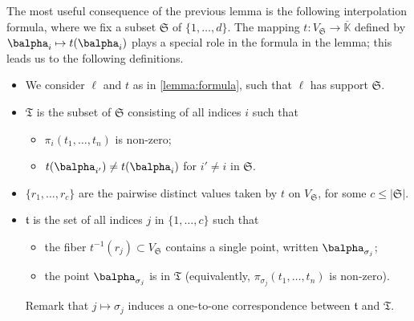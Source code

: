 \documentclass[12pt]{article}
\def\Kbar {{\ensuremath{\overline{\mathbb{K}}}}}
\begin{document}
\noindent 
The most useful consequence of the previous lemma is the following
interpolation formula, where we fix a subset $\mathfrak{S}$ of 
$\{1,\dots,d\}$. The mapping $t:V_\mathfrak{S} \to \Kbar$
defined by $\balpha_i \mapsto t(\balpha_{i})$ plays a special role in
the formula in the lemma; this leads us to the following definitions.
\begin{itemize}
	\item We consider $\ell$ and $t$ as in \cref{lemma:formula}, such
	that $\ell$ has support $\mathfrak{S}$.
	\item $\mathfrak{T}$ is the subset of $\mathfrak{S}$ consisting of
	all indices $i$ such that 
	\begin{itemize}
		\item $\pi_i(t_1,\dots,t_n)$ is non-zero;
		\item $t(\balpha_{i'}) \ne t(\balpha_i)$ for $i' \ne i$ in $\mathfrak{S}$.
	\end{itemize}
	\item $\{r_1,\dots,r_c\}$ are the pairwise distinct values taken by $t$ on
	$V_\mathfrak{S}$, for some $c \le |\mathfrak{S}|$.
	\item $\mathfrak{t}$ is the set of all indices $j$ in
	$\{1,\dots,c\}$ such that
	\begin{itemize}
		\item the fiber $t^{-1}(r_j) \subset V_{\mathfrak{S}}$ contains a single
		point, written $\balpha_{\sigma_j}$;
		\item the point $\balpha_{\sigma_j}$ is in $\mathfrak{T}$
		(equivalently,  $\pi_{\sigma_j}(t_1,\dots,t_n)$ is non-zero).
	\end{itemize}
	Remark that $j \mapsto \sigma_j$ induces a one-to-one correspondence
	between  $\mathfrak{t}$ and  $\mathfrak{T}$.
\end{itemize}
\end{document}
